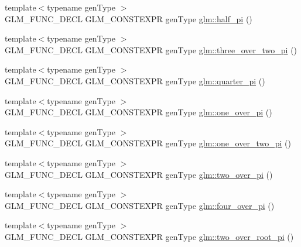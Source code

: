 \begin{DoxyCompactItemize}
\item 
{\footnotesize template$<$typename gen\-Type $>$ }\\G\-L\-M\-\_\-\-F\-U\-N\-C\-\_\-\-D\-E\-C\-L G\-L\-M\-\_\-\-C\-O\-N\-S\-T\-E\-X\-P\-R gen\-Type \hyperlink{group__gtc__constants_ga0c36b41d462e45641faf7d7938948bac}{glm\-::half\-\_\-pi} ()
\item 
{\footnotesize template$<$typename gen\-Type $>$ }\\G\-L\-M\-\_\-\-F\-U\-N\-C\-\_\-\-D\-E\-C\-L G\-L\-M\-\_\-\-C\-O\-N\-S\-T\-E\-X\-P\-R gen\-Type \hyperlink{group__gtc__constants_gae94950df74b0ce382b1fc1d978ef7394}{glm\-::three\-\_\-over\-\_\-two\-\_\-pi} ()
\item 
{\footnotesize template$<$typename gen\-Type $>$ }\\G\-L\-M\-\_\-\-F\-U\-N\-C\-\_\-\-D\-E\-C\-L G\-L\-M\-\_\-\-C\-O\-N\-S\-T\-E\-X\-P\-R gen\-Type \hyperlink{group__gtc__constants_ga3c9df42bd73c519a995c43f0f99e77e0}{glm\-::quarter\-\_\-pi} ()
\item 
{\footnotesize template$<$typename gen\-Type $>$ }\\G\-L\-M\-\_\-\-F\-U\-N\-C\-\_\-\-D\-E\-C\-L G\-L\-M\-\_\-\-C\-O\-N\-S\-T\-E\-X\-P\-R gen\-Type \hyperlink{group__gtc__constants_ga555150da2b06d23c8738981d5013e0eb}{glm\-::one\-\_\-over\-\_\-pi} ()
\item 
{\footnotesize template$<$typename gen\-Type $>$ }\\G\-L\-M\-\_\-\-F\-U\-N\-C\-\_\-\-D\-E\-C\-L G\-L\-M\-\_\-\-C\-O\-N\-S\-T\-E\-X\-P\-R gen\-Type \hyperlink{group__gtc__constants_ga7c922b427986cbb2e4c6ac69874eefbc}{glm\-::one\-\_\-over\-\_\-two\-\_\-pi} ()
\item 
{\footnotesize template$<$typename gen\-Type $>$ }\\G\-L\-M\-\_\-\-F\-U\-N\-C\-\_\-\-D\-E\-C\-L G\-L\-M\-\_\-\-C\-O\-N\-S\-T\-E\-X\-P\-R gen\-Type \hyperlink{group__gtc__constants_ga74eadc8a211253079683219a3ea0462a}{glm\-::two\-\_\-over\-\_\-pi} ()
\item 
{\footnotesize template$<$typename gen\-Type $>$ }\\G\-L\-M\-\_\-\-F\-U\-N\-C\-\_\-\-D\-E\-C\-L G\-L\-M\-\_\-\-C\-O\-N\-S\-T\-E\-X\-P\-R gen\-Type \hyperlink{group__gtc__constants_ga753950e5140e4ea6a88e4a18ba61dc09}{glm\-::four\-\_\-over\-\_\-pi} ()
\item 
{\footnotesize template$<$typename gen\-Type $>$ }\\G\-L\-M\-\_\-\-F\-U\-N\-C\-\_\-\-D\-E\-C\-L G\-L\-M\-\_\-\-C\-O\-N\-S\-T\-E\-X\-P\-R gen\-Type \hyperlink{group__gtc__constants_ga5827301817640843cf02026a8d493894}{glm\-::two\-\_\-over\-\_\-root\-\_\-pi} ()

\end{DoxyCompactItemize}
